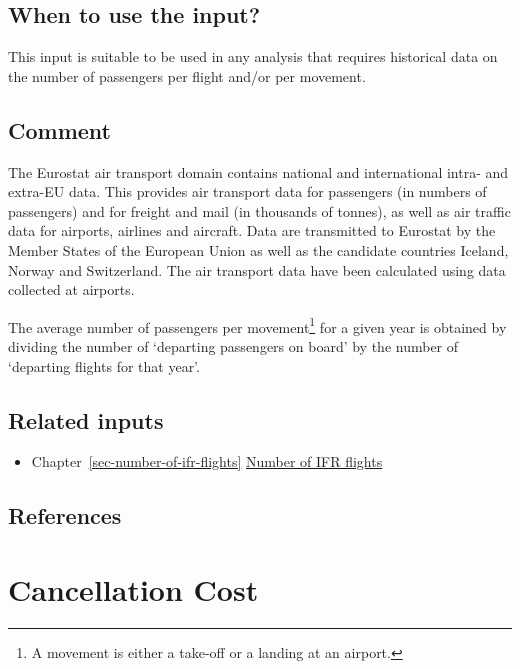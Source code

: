 \documentclass[
  11pt,
  a4paper,
]{book}
\providecommand{\tightlist}{%
  \setlength{\itemsep}{0pt}\setlength{\parskip}{0pt}}\usepackage{longtable,booktabs,array}
\begin{document}
\hypertarget{when-to-use-the-input-6}{%
\section{When to use the input?}\label{when-to-use-the-input-6}}

This input is suitable to be used in any analysis that requires
historical data on the number of passengers per flight and/or per
movement.

\hypertarget{comment-1}{%
\section{Comment}\label{comment-1}}

The Eurostat air transport domain contains national and international
intra- and extra-EU data. This provides air transport data for
passengers (in numbers of passengers) and for freight and mail (in
thousands of tonnes), as well as air traffic data for airports, airlines
and aircraft. Data are transmitted to Eurostat by the Member States of
the European Union as well as the candidate countries Iceland, Norway
and Switzerland. The air transport data have been calculated using data
collected at airports.

The average number of passengers per movement\footnote{A movement is
  either a take-off or a landing at an airport.} for a given year is
obtained by dividing the number of `departing passengers on board' by
the number of `departing flights for that year'.

\hypertarget{related-inputs-9}{%
\section{Related inputs}\label{related-inputs-9}}

\begin{itemize}
\tightlist
\item
  Chapter~\ref{sec-number-of-ifr-flights}
  \protect\hyperlink{sec-number-of-ifr-flights}{Number of IFR flights}
\end{itemize}

\hypertarget{references-10}{%
\section{References}\label{references-10}}

\hypertarget{sec-cancellation-cost}{%
\chapter{Cancellation Cost}\label{sec-cancellation-cost}}
\end{document}
